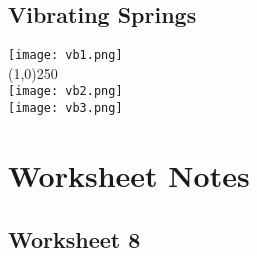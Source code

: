 \documentclass[11pt]{article}
\theoremstyle{definition}
\begin{document}
\subsection{Vibrating Springs}
\texttt{[image: vb1.png]}\\
\line(1,0){250}\\
\texttt{[image: vb2.png]}\\
\texttt{[image: vb3.png]}
\section{Worksheet Notes}
\subsection{Worksheet 8}
\end{document}
